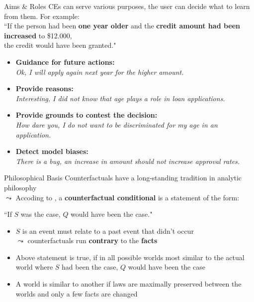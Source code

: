 \documentclass[11pt,compress,t,notes=noshow, aspectratio=169, xcolor=table, usenames,dvipsnames]{beamer}
\begin{document}
\begin{frame}[c]{Aims \& Roles}
	CEs can serve various purposes, the user can decide what to learn from them.
	For example:  \\[0.2cm]
	``If the person had been \textbf{one year older} and the \textbf{credit amount had been increased} to \$12.000,\\ the credit would have been granted."  \\[0.2cm]
	\pause
	\begin{itemize}[<+->]
		\itemsep1.2em
		\item \textbf{Guidance for future actions:}\\ \textit{Ok, I will apply again next year for the higher amount.}
		\item \textbf{Provide reasons:}\\ \textit{Interesting, I did not know that age plays a role in loan applications.}
		\item \textbf{Provide grounds to contest the decision:}\\ \textit{How dare you, I do not want to be discriminated for my age in an application.}
		\item \textbf{Detect model biases:}\\ \textit{There is a bug, an increase in amount should not increase approval rates.}
	\end{itemize}
\end{frame}


\begin{frame}{Philosophical Basis}
Counterfactuals have a long-standing tradition in analytic philosophy\\
$\leadsto$ %
Accoding to , a \textbf{counterfactual conditional} is a statement of the form:

\begin{center}
``If $S$ was the case, $Q$ would have been the case."
\end{center}

\pause

	\begin{itemize}[<+->]
		\item $S$ is an event must relate to a past event that didn't occur\\ $\leadsto$ counterfactuals run \textbf{contrary} to the \textbf{facts}
		\item Above statement is true, if in all possible worlds most similar to the actual world where $S$ had been the case, $Q$ would have been the case
		\item A world is similar to another if laws are maximally preserved between the worlds and only a few facts are changed
	\end{itemize}
\end{frame}
\end{document}
